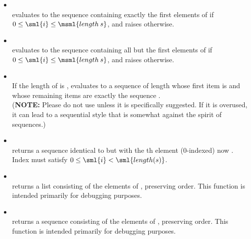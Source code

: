 \begin{itemize}
\item {}\\ 
  evaluates to the sequence containing exactly the first  elements of 
  if $0 \leq \sml{i} \leq \msml{length \: s}$, and raises  otherwise.

\item {}\\ 
  evaluates to the sequence containing all but the first  elements of 
  if $0 \leq \sml{i} \leq \msml{length \: s}$, and raises  otherwise.

\item {}\\ If the
  length of  is ,  evaluates to a
  sequence of length  whose first item is  and whose
  remaining  items are exactly the sequence .\\
  (\textbf{NOTE:} Please do not use  unless it is specifically
  suggested. If it is overused, it can lead to a sequential style that is
  somewhat against the spirit of sequences.)

\item {}\\  returns a sequence
  identical to  but with the th element (0-indexed) now .
  Index  must satisfy $0 \leq \sml{i} < \sml{length(s)}$.

\item {}\\ 
  returns a list consisting of the elements of , preserving
  order.  This function is intended primarily for debugging purposes.

\item {}\\ 
  returns a sequence consisting of the elements of ,
  preserving order.  This function is intended primarily for debugging
  purposes.

\end{itemize}

